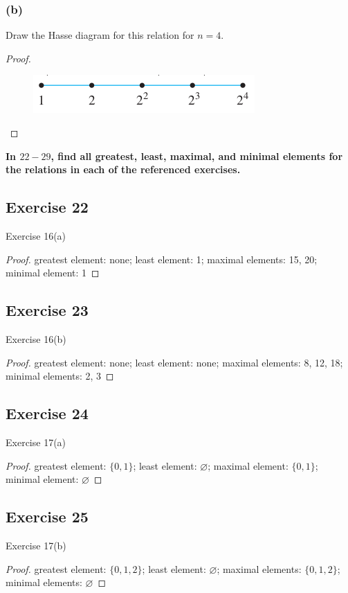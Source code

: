 \documentclass[14pt]{extarticle}
\newcommand{\es}{\varnothing}
\newcommand{\cy}{\color{cyan}}
\begin{document}
\subsubsection{(b)}
Draw the Hasse diagram for this relation for \(n = 4\).

\begin{proof}
\begin{figure}[ht!]
\centering
\includegraphics[scale=0.4]{../images/8.5.21.b.png}
\end{figure}
\end{proof}

{\bf \cy In $22-29$, find all greatest, least, maximal, and minimal elements for the relations in each of the 
referenced exercises.}

\subsection{Exercise 22}
Exercise 16(a)
\begin{proof}
greatest element: none; least element: 1; maximal elements: 15, 20; minimal element: 1
\end{proof}

\subsection{Exercise 23}
Exercise 16(b)
\begin{proof}
greatest element: none; least element: none; maximal elements: 8, 12, 18; minimal elements: 2, 3
\end{proof}

\subsection{Exercise 24}
Exercise 17(a)
\begin{proof}
greatest element: \(\{0, 1\}\); least element: \(\es\); maximal element: \(\{0, 1\}\); minimal element: \(\es\)
\end{proof}

\subsection{Exercise 25}
Exercise 17(b)
\begin{proof}
greatest element: \(\{0,1,2\}\); least element: \(\es\); maximal elements: \(\{0,1,2\}\); minimal elements: \(\es\)
\end{proof}
\end{document}
